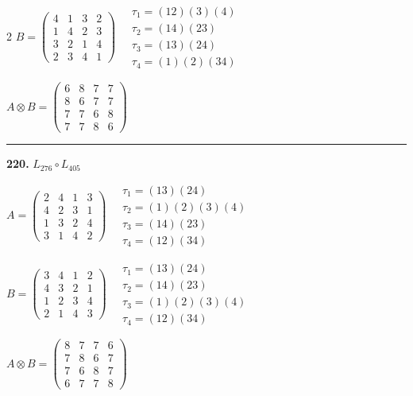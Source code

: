 \begin{multicols}{2}
$B = \begin{pmatrix} 4 & 1 & 3 & 2 \\ 1 & 4 & 2 & 3 \\ 3 & 2 & 1 & 4 \\ 2 & 3 & 4 & 1 \end{pmatrix} \quad \begin{matrix} \tau_{1}=(1 2)(3)(4) \\ \tau_{2}=(1 4)(2 3) \\ \tau_{3}=(1 3)(2 4) \\ \tau_{4}=(1)(2)(3 4) \end{matrix}$

$A \otimes B = \begin{pmatrix} 6 & 8 & 7 & 7 \\ 8 & 6 & 7 & 7 \\ 7 & 7 & 6 & 8 \\ 7 & 7 & 8 & 6 \end{pmatrix}$

\vspace{0.3em}
\hrule
\vspace{0.3em}

\noindent\textbf{220.} $L_{276} \circ L_{405}$

$A = \begin{pmatrix} 2 & 4 & 1 & 3 \\ 4 & 2 & 3 & 1 \\ 1 & 3 & 2 & 4 \\ 3 & 1 & 4 & 2 \end{pmatrix} \quad \begin{matrix} \tau_{1}=(1 3)(2 4) \\ \tau_{2}=(1)(2)(3)(4) \\ \tau_{3}=(1 4)(2 3) \\ \tau_{4}=(1 2)(3 4) \end{matrix}$

$B = \begin{pmatrix} 3 & 4 & 1 & 2 \\ 4 & 3 & 2 & 1 \\ 1 & 2 & 3 & 4 \\ 2 & 1 & 4 & 3 \end{pmatrix} \quad \begin{matrix} \tau_{1}=(1 3)(2 4) \\ \tau_{2}=(1 4)(2 3) \\ \tau_{3}=(1)(2)(3)(4) \\ \tau_{4}=(1 2)(3 4) \end{matrix}$

$A \otimes B = \begin{pmatrix} 8 & 7 & 7 & 6 \\ 7 & 8 & 6 & 7 \\ 7 & 6 & 8 & 7 \\ 6 & 7 & 7 & 8 \end{pmatrix}$


\end{multicols}
